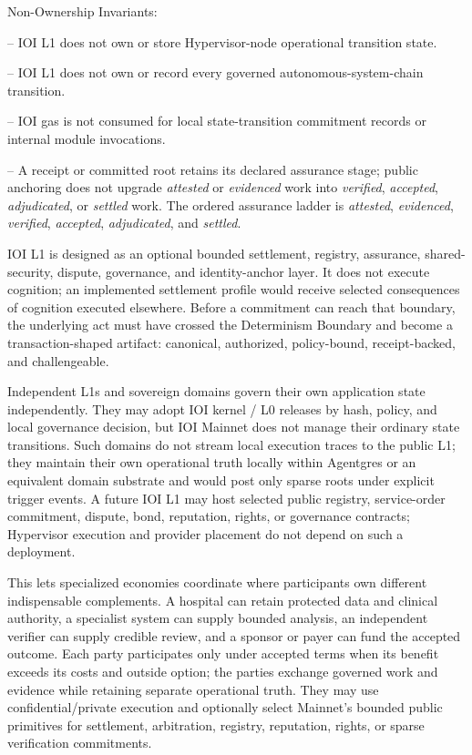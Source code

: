 \documentclass[
  11pt,
]{article}
\begin{document}
Non-Ownership Invariants:

-- IOI L1 does not own or store Hypervisor-node operational transition state.

-- IOI L1 does not own or record every governed autonomous-system-chain
transition.

-- IOI gas is not consumed for local state-transition commitment records or internal
module invocations.

-- A receipt or committed root retains its declared assurance stage; public
anchoring does not upgrade \emph{attested} or \emph{evidenced} work into
\emph{verified}, \emph{accepted}, \emph{adjudicated}, or \emph{settled}
work. The ordered assurance ladder is \emph{attested}, \emph{evidenced},
\emph{verified}, \emph{accepted}, \emph{adjudicated}, and \emph{settled}.

IOI L1 is designed as an optional bounded settlement, registry, assurance,
shared-security, dispute, governance, and identity-anchor layer. It does not execute cognition; an
implemented settlement profile would receive selected consequences of
cognition executed elsewhere. Before a commitment can reach that boundary,
the underlying act must have crossed the Determinism Boundary and become a
transaction-shaped artifact: canonical, authorized, policy-bound,
receipt-backed, and challengeable.

Independent L1s and sovereign domains govern their own application state
independently. They may adopt IOI kernel / L0 releases by hash, policy,
and local governance decision, but IOI Mainnet does not manage their
ordinary state transitions. Such domains do not stream local execution
traces to the public L1; they maintain their own operational truth
locally within Agentgres or an equivalent domain substrate and would post
only sparse roots under explicit trigger events. A future IOI L1 may host
selected public registry, service-order commitment, dispute, bond,
reputation, rights, or governance contracts; Hypervisor execution and
provider placement do not depend on such a deployment.

This lets specialized economies coordinate where participants own different
indispensable complements. A hospital can retain protected data and clinical
authority, a specialist system can supply bounded analysis, an independent
verifier can supply credible review, and a sponsor or payer can fund the
accepted outcome. Each party participates only under accepted terms when its
benefit exceeds its costs and outside option; the parties exchange governed
work and evidence while retaining separate operational truth. They may use
confidential/private execution and optionally select Mainnet's bounded public
primitives for settlement, arbitration, registry, reputation, rights, or sparse
verification commitments.
\end{document}
